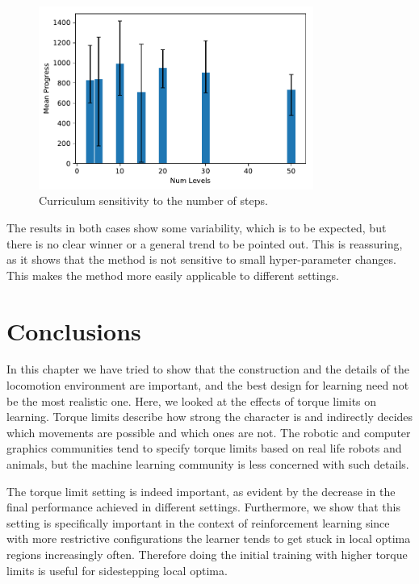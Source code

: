\begin{figure}
    \centering
    \includegraphics[width=90mm]{img/TorqueLimit_Curr_Steps.pdf}
    \caption{Curriculum sensitivity to the number of steps.}
    \label{fig:torque_limit_hp_steps}
\end{figure}

The results in both cases show some variability, which is to be expected, but there is no clear winner or a general trend to be pointed out. This is reassuring, as it shows that the method is not sensitive to small hyper-parameter changes. This makes the method more easily applicable to different settings.



\section{Conclusions}
In this chapter we have tried to show that the construction and the details of the locomotion environment are important, and the best design for learning need not be the most realistic one. Here, we looked at the effects of torque limits on learning. Torque limits describe how strong the character is and indirectly decides which movements are possible and which ones are not. The robotic and computer graphics communities tend to specify torque limits based on real life robots and animals, but the machine learning community is less concerned with such details.

The torque limit setting is indeed important, as evident by the decrease in the final performance achieved in different settings. Furthermore, we show that this setting is specifically important in the context of reinforcement learning since with more restrictive configurations the learner tends to get stuck in local optima regions increasingly often. Therefore doing the initial training with higher torque limits is useful for sidestepping local optima.

